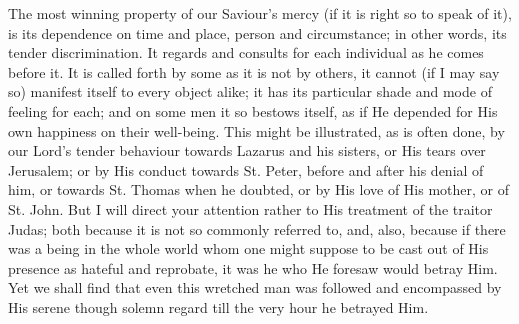 The most winning property of our Saviour's mercy (if it is right so
to speak of it), is its dependence on time and place, person and
circumstance; in other words, its tender discrimination. It regards
and consults for each individual as he comes before it. It is called
forth by some as it is not by others, it cannot (if I may say so)
manifest itself to every object alike; it has its particular shade and
mode of feeling for each; and on some men it so bestows itself, as if
He depended for His own happiness on their well-being. This might be
illustrated, as is often done, by our Lord's tender behaviour towards
Lazarus and his sisters, or His tears over Jerusalem; or by His
conduct towards St. Peter, before and after his denial of him, or
towards St. Thomas when he doubted, or by His love of His mother, or
of St. John. But I will direct your attention rather to His treatment
of the traitor Judas; both because it is not so commonly referred to,
and, also, because if there was a being in the whole world whom one
might suppose to be cast out of His presence as hateful and reprobate,
it was he who He foresaw would betray Him. Yet we shall find that even
this wretched man was followed and encompassed by His serene though
solemn regard till the very hour he betrayed Him.

